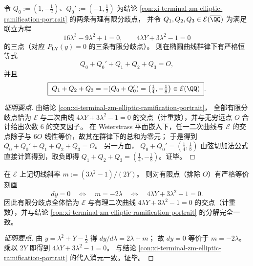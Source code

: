 \begin{conclusion}\label{con:xi-terminal-zm-branchpoint-group-trace}
令 \(Q_0:=(1,-\tfrac12)\)、\(Q_0':=(-1,\tfrac12)\) 为结论 \ref{con:xi-terminal-zm-elliptic-ramification-portrait} 的两条有理有限分歧点，
并令 \(Q_1,Q_2,Q_3\in\mathcal{E}(\overline{\QQ})\) 为满足联立方程
\[
16\lambda^{3}-9\lambda^{2}+1=0,\qquad 4\lambda Y+3\lambda^{2}-1=0
\]
的三点（对应 \(P_{\mathrm{LY}}(y)=0\) 的三条有限分歧点）。
则在椭圆曲线群律下有严格恒等式
\[
Q_0+Q_0'+Q_1+Q_2+Q_3=O,
\]
并且
\[
\boxed{\;
Q_1+Q_2+Q_3
=-(Q_0+Q_0')
=\bigl(\tfrac14,-\tfrac18\bigr)\in\mathcal{E}(\QQ)\; }.
\]
\end{conclusion}
\begin{proof}[证明要点]
由结论 \ref{con:xi-terminal-zm-elliptic-ramification-portrait}，
全部有限分歧点恰为 \(\mathcal{E}\) 与二次曲线 \(4\lambda Y+3\lambda^{2}-1=0\) 的交点（计重数），并与无穷远点 \(O\) 合计给出次数 \(6\) 的交叉因子。
在 Weierstrass 平面嵌入下，任一二次曲线与 \(\mathcal{E}\) 的交点除子与 \(6O\) 线性等价，故其在群律下的总和为零元；
于是得到 \(Q_0+Q_0'+Q_1+Q_2+Q_3=O\)。
另一方面，
\(
Q_0+Q_0'=(\tfrac14,\tfrac18)
\)
由弦切加法公式直接计算得到，取负即得 \(Q_1+Q_2+Q_3=(\tfrac14,-\tfrac18)\)。证毕。
\end{proof}

\begin{conclusion}[有限分歧点的切线斜率锁定：\(dy=0\) 等价于 \(m=-2\lambda\)]\label{con:xi-terminal-zm-branch-slope-lock}
在 \(\mathcal{E}\) 上记切线斜率
\(
m:=(3\lambda^{2}-1)/(2Y)
\)。
则对有限点（排除 \(O\)）有严格等价刻画
\[
dy=0\quad\Longleftrightarrow\quad m=-2\lambda\quad\Longleftrightarrow\quad 4\lambda Y+3\lambda^{2}-1=0.
\]
因此有限分歧点全体恰为 \(\mathcal{E}\) 与有理二次曲线 \(4\lambda Y+3\lambda^{2}-1=0\) 的交点（计重数），并与结论 \ref{con:xi-terminal-zm-elliptic-ramification-portrait} 的分解完全一致。
\end{conclusion}
\begin{proof}[证明要点]
由 \(y=\lambda^{2}+Y-\tfrac12\) 得
\(
dy/d\lambda=2\lambda+m
\)；
故 \(dy=0\) 等价于 \(m=-2\lambda\)。
乘以 \(2Y\) 即得到 \(4\lambda Y+3\lambda^{2}-1=0\)。
与结论 \ref{con:xi-terminal-zm-elliptic-ramification-portrait} 的代入消元一致。证毕。
\end{proof}







